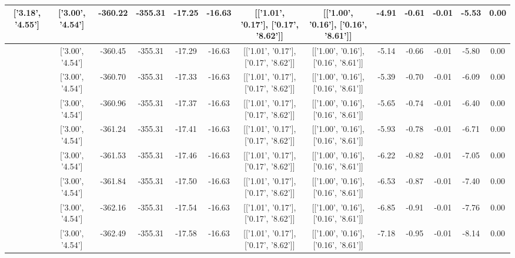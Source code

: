 \begin{table}[htbp]
\begin{adjustbox}{angle=90}
\begin{tabular}{|c|c|c|c|c|c|c|c|c|c|c|c|c|}
 ['3.18', '4.55'] & ['3.00', '4.54'] & -360.22 & -355.31 & -17.25 & -16.63 & [['1.01', '0.17'], ['0.17', '8.62']] & [['1.00', '0.16'], ['0.16', '8.61']] & -4.91 & -0.61 & -0.01 & -5.53 & 0.00\\ \hline
 ['3.19', '4.55'] & ['3.00', '4.54'] & -360.45 & -355.31 & -17.29 & -16.63 & [['1.01', '0.17'], ['0.17', '8.62']] & [['1.00', '0.16'], ['0.16', '8.61']] & -5.14 & -0.66 & -0.01 & -5.80 & 0.00\\ \hline
 ['3.20', '4.55'] & ['3.00', '4.54'] & -360.70 & -355.31 & -17.33 & -16.63 & [['1.01', '0.17'], ['0.17', '8.62']] & [['1.00', '0.16'], ['0.16', '8.61']] & -5.39 & -0.70 & -0.01 & -6.09 & 0.00\\ \hline
 ['3.22', '4.55'] & ['3.00', '4.54'] & -360.96 & -355.31 & -17.37 & -16.63 & [['1.01', '0.17'], ['0.17', '8.62']] & [['1.00', '0.16'], ['0.16', '8.61']] & -5.65 & -0.74 & -0.01 & -6.40 & 0.00\\ \hline
 ['3.23', '4.55'] & ['3.00', '4.54'] & -361.24 & -355.31 & -17.41 & -16.63 & [['1.01', '0.17'], ['0.17', '8.62']] & [['1.00', '0.16'], ['0.16', '8.61']] & -5.93 & -0.78 & -0.01 & -6.71 & 0.00\\ \hline
 ['3.24', '4.55'] & ['3.00', '4.54'] & -361.53 & -355.31 & -17.46 & -16.63 & [['1.01', '0.17'], ['0.17', '8.62']] & [['1.00', '0.16'], ['0.16', '8.61']] & -6.22 & -0.82 & -0.01 & -7.05 & 0.00\\ \hline
 ['3.25', '4.56'] & ['3.00', '4.54'] & -361.84 & -355.31 & -17.50 & -16.63 & [['1.01', '0.17'], ['0.17', '8.62']] & [['1.00', '0.16'], ['0.16', '8.61']] & -6.53 & -0.87 & -0.01 & -7.40 & 0.00\\ \hline
 ['3.26', '4.56'] & ['3.00', '4.54'] & -362.16 & -355.31 & -17.54 & -16.63 & [['1.01', '0.17'], ['0.17', '8.62']] & [['1.00', '0.16'], ['0.16', '8.61']] & -6.85 & -0.91 & -0.01 & -7.76 & 0.00\\ \hline
 ['3.28', '4.56'] & ['3.00', '4.54'] & -362.49 & -355.31 & -17.58 & -16.63 & [['1.01', '0.17'], ['0.17', '8.62']] & [['1.00', '0.16'], ['0.16', '8.61']] & -7.18 & -0.95 & -0.01 & -8.14 & 0.00\\ \hline
            \end{tabular}
        \end{adjustbox}
        \caption{}
        \label{}
    \end{table}
    